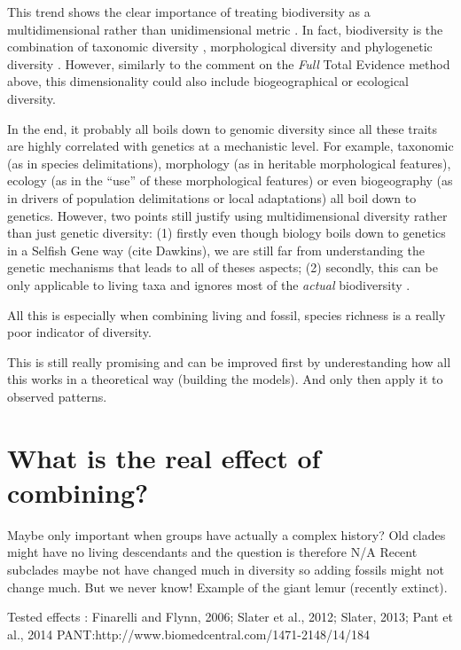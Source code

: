 This trend shows the clear importance of treating biodiversity as a multidimensional rather than unidimensional metric \citep[similarly as in ecology;][]{DonohueDim}.
In fact, biodiversity is the combination of taxonomic diversity \citep[e.g.][]{Stadler12042011}, morphological diversity \citep[from cladistics or morphometrics;][]{hetherington2015cladistic} and phylogenetic diversity \citep[e.g. the evolutionary rates regimes;][]{Close2015}.
However, similarly to the comment on the \textit{Full} Total Evidence method above, this dimensionality could also include biogeographical or ecological diversity.

In the end, it probably all boils down to genomic diversity since all these traits are highly correlated with genetics at a mechanistic level.
For example, taxonomic (as in species delimitations), morphology (as in heritable morphological features), ecology (as in the ``use'' of these morphological features) or even biogeography (as in drivers of population delimitations or local adaptations) all boil down to genetics.
However, two points still justify using multidimensional diversity rather than just genetic diversity: (1) firstly even though biology boils down to genetics in a Selfish Gene way (cite Dawkins), we are still far from understanding the genetic mechanisms that leads to all of theses aspects; (2) secondly, this can be only applicable to living taxa and ignores most of the \textit{actual} biodiversity \citep{novacek1992ext,raup1993extinction}.

All this is especially when combining living and fossil, species richness is a really poor indicator of diversity.

This is still really promising and can be improved first by underestanding how all this works in a theoretical way (building the models).
And only then apply it to observed patterns.

\section{What is the real effect of combining?}
Maybe only important when groups have actually a complex history?
Old clades might have no living descendants and the question is therefore N/A
Recent subclades maybe not have changed much in diversity so adding fossils might not change much.
But we never know! Example of the giant lemur (recently extinct).

Tested effects : Finarelli and Flynn, 2006; Slater et al., 2012; Slater, 2013; Pant et al., 2014   PANT:http://www.biomedcentral.com/1471-2148/14/184


